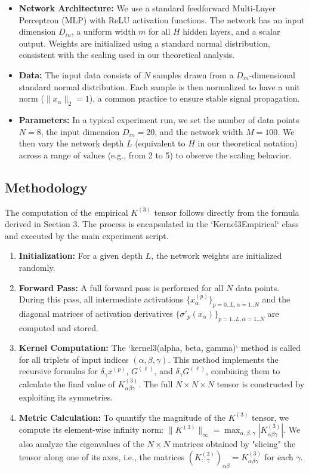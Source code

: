 \documentclass{article}
\begin{document}
\begin{itemize}
    \item \textbf{Network Architecture:} We use a standard feedforward Multi-Layer Perceptron (MLP) with ReLU activation functions. The network has an input dimension $D_{in}$, a uniform width $m$ for all $H$ hidden layers, and a scalar output. Weights are initialized using a standard normal distribution, consistent with the scaling used in our theoretical analysis.

    \item \textbf{Data:} The input data consists of $N$ samples drawn from a $D_{in}$-dimensional standard normal distribution. Each sample is then normalized to have a unit norm ($\|x_\alpha\|_2 = 1$), a common practice to ensure stable signal propagation.

    \item \textbf{Parameters:} In a typical experiment run, we set the number of data points $N=8$, the input dimension $D_{in}=20$, and the network width $M=100$. We then vary the network depth $L$ (equivalent to $H$ in our theoretical notation) across a range of values (e.g., from 2 to 5) to observe the scaling behavior.
\end{itemize}

\subsection{Methodology}

The computation of the empirical $K^{(3)}$ tensor follows directly from the formula derived in Section 3. The process is encapsulated in the `Kernel3Empirical` class and executed by the main experiment script.

\begin{enumerate}
    \item \textbf{Initialization:} For a given depth $L$, the network weights are initialized randomly.
    \item \textbf{Forward Pass:} A full forward pass is performed for all $N$ data points. During this pass, all intermediate activations $\{x^{(p)}_\alpha\}_{p=0..L, \alpha=1..N}$ and the diagonal matrices of activation derivatives $\{\sigma'_p(x_\alpha)\}_{p=1..L, \alpha=1..N}$ are computed and stored.
    \item \textbf{Kernel Computation:} The `kernel3(alpha, beta, gamma)` method is called for all triplets of input indices $(\alpha, \beta, \gamma)$. This method implements the recursive formulas for $\delta_\gamma x^{(p)}$, $G^{(\ell)}$, and $\delta_\gamma G^{(\ell)}$, combining them to calculate the final value of $K^{(3)}_{\alpha\beta\gamma}$. The full $N \times N \times N$ tensor is constructed by exploiting its symmetries.
    \item \textbf{Metric Calculation:} To quantify the magnitude of the $K^{(3)}$ tensor, we compute its element-wise infinity norm: $\|K^{(3)}\|_\infty = \max_{\alpha,\beta,\gamma} |K^{(3)}_{\alpha\beta\gamma}|$. We also analyze the eigenvalues of the $N \times N$ matrices obtained by "slicing" the tensor along one of its axes, i.e., the matrices $(K^{(3)}_{::\gamma})_{\alpha\beta} = K^{(3)}_{\alpha\beta\gamma}$ for each $\gamma$.
\end{enumerate}
\end{document}
